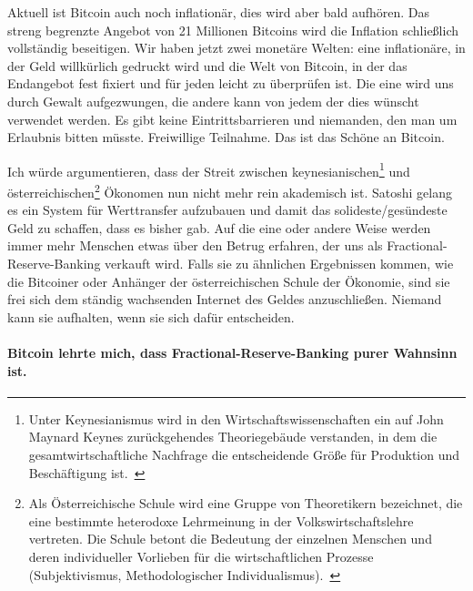 Aktuell ist Bitcoin auch noch inflationär, dies wird aber bald aufhören. Das
streng begrenzte Angebot von 21 Millionen Bitcoins wird die Inflation
schließlich vollständig beseitigen. Wir haben jetzt zwei monetäre Welten: eine
inflationäre, in der Geld willkürlich gedruckt wird und die Welt von Bitcoin, in
der das Endangebot fest fixiert und für jeden leicht zu überprüfen ist. Die eine
wird uns durch Gewalt aufgezwungen, die andere kann von jedem der dies wünscht
verwendet werden. Es gibt keine Eintrittsbarrieren und niemanden, den man um
Erlaubnis bitten müsste. Freiwillige Teilnahme. Das ist das Schöne an Bitcoin.

Ich würde argumentieren, dass der Streit zwischen keynesianischen\footnote{Unter
Keynesianismus wird in den Wirtschaftswissenschaften ein auf John Maynard Keynes
zurückgehendes Theoriegebäude verstanden, in dem die gesamtwirtschaftliche
Nachfrage die entscheidende Größe für Produktion und Beschäftigung
ist.~\cite{wiki:keynesian}} und österreichischen\footnote{Als Österreichische
Schule wird eine Gruppe von Theoretikern bezeichnet, die eine bestimmte
heterodoxe Lehrmeinung in der Volkswirtschaftslehre vertreten. Die Schule betont
die Bedeutung der einzelnen Menschen und deren individueller Vorlieben für die
wirtschaftlichen Prozesse (Subjektivismus, Methodologischer
Individualismus).~\cite{wiki:austrian}} Ökonomen nun nicht mehr rein akademisch
ist. Satoshi gelang es ein System für Werttransfer aufzubauen und
damit das solideste/gesündeste Geld zu schaffen, dass es bisher gab. Auf die
eine oder andere Weise werden immer mehr Menschen etwas über den Betrug
erfahren, der uns als Fractional-Reserve-Banking verkauft wird. Falls sie zu
ähnlichen Ergebnissen kommen, wie die Bitcoiner oder Anhänger der
österreichischen Schule der Ökonomie, sind sie frei sich dem ständig wachsenden
Internet des Geldes anzuschließen. Niemand kann sie aufhalten, wenn sie sich
dafür entscheiden.

\paragraph{Bitcoin lehrte mich, dass Fractional-Reserve-Banking purer Wahnsinn ist.}

%
%
%
%
%
